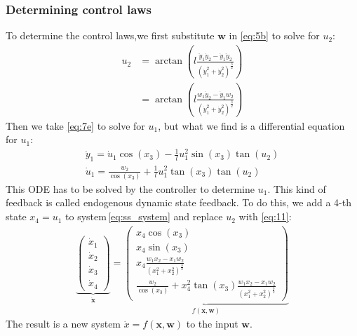 \documentclass[a4paper,11pt,headings=standardclasses,parskip=half]{scrartcl}
\newcommand{\x}{\mathbf{x}}
\begin{document}
\subsubsection{Determining control laws}
To determine the control laws,we first substitute $\mathbf{w}$ in \eqref{eq:5b} to solve for $u_2$:
\begin{subequations}
\label{eq:11}
\begin{align}
u_2 &= \arctan\left(l \frac{\ddot{y}_1 \dot{y}_2 - \dot{y}_1 \ddot{y}_2}{(\dot{y}_1^2+\dot{y}_2^2)^{\frac{3}{2}}} 
\right) \\
&= \arctan\left(l \frac{w_1 \dot{y}_2 - \dot{y}_1 w_2}{(\dot{y}_1^2+\dot{y}_2^2)^{\frac{3}{2}}} 
\right) 
\end{align}
\end{subequations} 
Then we take \eqref{eq:7e} to solve for $u_1$, but what we find is a differential equation for $u_1$:
\begin{subequations}
\begin{align}
\ddot{y}_1 = \dot{u}_1 \cos(x_3) - \frac{1}{l}u_1^2\sin(x_3)\tan(u_2) \\
\dot{u}_1 = \frac{w_2}{\cos(x_3)} + \frac{1}{l}u_1^2\tan(x_3)\tan(u_2)
\end{align}
\end{subequations}
This ODE  has to be solved by the controller to determine $u_1$. This kind of feedback is called endogenous dynamic state feedback. To do this, we add a 4-th state $x_4 = u_1$ to system\,\eqref{eq:ss_system} and replace $u_2$ with \eqref{eq:11}:
\begin{align}
\underbrace{\begin{pmatrix} \dot{x}_1 \\ \dot{x}_2 \\ \dot{x}_3 \\ \dot{x}_4\end{pmatrix}}_{\dot{\x}} = \underbrace{\begin{pmatrix}  x_4 \cos(x_3) \\ x_4 \sin(x_3) \\ x_4 \frac{w_1 x_2 - x_1 w_2}{(x_1^2+x_2^2)^{\frac{3}{2}}} \\ \frac{w_2}{\cos(x_3)} + x_4^2\tan(x_3) \frac{w_1 x_2 - x_1 w_2}{(x_1^2+x_2^2)^{\frac{3}{2}}}\end{pmatrix}}_{f(\x,\mathbf{w})}
\end{align}
The result is a new system $\dot{x}=f(\x,\mathbf{w})$ to the input $\mathbf{w}$.
\end{document}
